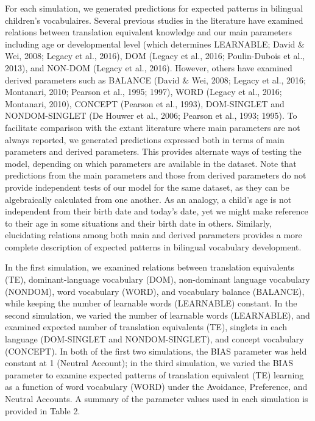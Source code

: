 \documentclass[
  english,
  ,man,floatsintext]{apa6}
\begin{document}
For each simulation, we generated predictions for expected patterns in bilingual children's vocabulaires. Several previous studies in the literature have examined relations between translation equivalent knowledge and our main parameters including age or developmental level (which determines LEARNABLE; David \& Wei, 2008; Legacy et al., 2016), DOM (Legacy et al., 2016; Poulin-Dubois et al., 2013), and NON-DOM (Legacy et al., 2016). However, others have examined derived parameters such as BALANCE (David \& Wei, 2008; Legacy et al., 2016; Montanari, 2010; Pearson et al., 1995; 1997), WORD (Legacy et al., 2016; Montanari, 2010), CONCEPT (Pearson et al., 1993), DOM-SINGLET and NONDOM-SINGLET (De Houwer et al., 2006; Pearson et al., 1993; 1995). To facilitate comparison with the extant literature where main parameters are not always reported, we generated predictions expressed both in terms of main parameters and derived parameters. This provides alternate ways of testing the model, depending on which parameters are available in the dataset. Note that predictions from the main parameters and those from derived parameters do not provide independent tests of our model for the same dataset, as they can be algebraically calculated from one another. As an analogy, a child's age is not independent from their birth date and today's date, yet we might make reference to their age in some situations and their birth date in others. Similarly, elucidating relations among both main and derived parameters provides a more complete description of expected patterns in bilingual vocabulary development.

In the first simulation, we examined relations between translation equivalents (TE), dominant-language vocabulary (DOM), non-dominant language vocabulary (NONDOM), word vocabulary (WORD), and vocabulary balance (BALANCE), while keeping the number of learnable words (LEARNABLE) constant. In the second simulation, we varied the number of learnable words (LEARNABLE), and examined expected number of translation equivalents (TE), singlets in each language (DOM-SINGLET and NONDOM-SINGLET), and concept vocabulary (CONCEPT). In both of the first two simulations, the BIAS parameter was held constant at 1 (Neutral Account); in the third simulation, we varied the BIAS parameter to examine expected patterns of translation equivalent (TE) learning as a function of word vocabulary (WORD) under the Avoidance, Preference, and Neutral Accounts. A summary of the parameter values used in each simulation is provided in Table 2.
\end{document}
